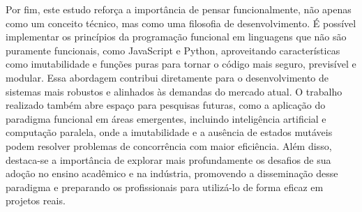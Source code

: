 Por fim, este estudo reforça a importância de pensar funcionalmente, não apenas como um conceito técnico, mas como uma filosofia de desenvolvimento. É possível implementar os princípios da programação funcional em linguagens que não são puramente funcionais, como JavaScript e Python, aproveitando características como imutabilidade e funções puras para tornar o código mais seguro, previsível e modular. Essa abordagem contribui diretamente para o desenvolvimento de sistemas mais robustos e alinhados às demandas do mercado atual.
O trabalho realizado também abre espaço para pesquisas futuras, como a aplicação do paradigma funcional em áreas emergentes, incluindo inteligência artificial e computação paralela, onde a imutabilidade e a ausência de estados mutáveis podem resolver problemas de concorrência com maior eficiência. Além disso, destaca-se a importância de explorar mais profundamente os desafios de sua adoção no ensino acadêmico e na indústria, promovendo a disseminação desse paradigma e preparando os profissionais para utilizá-lo de forma eficaz em projetos reais.


